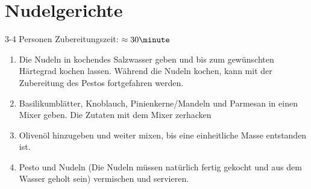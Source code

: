 \chapter{Nudelgerichte}
3-4 Personen \hfill Zubereitungszeit: $\approx30 \minute$
\hspace{0em}\\
\begin{enumerate}
\item   Die Nudeln in kochendes Salzwasser geben und bis zum gewünschten Härtegrad kochen lassen.
        Während die Nudeln kochen, kann mit der Zubereitung des Pestos fortgefahren werden.
\item   Basilikumblätter, Knoblauch, Pinienkerne/Mandeln und Parmesan in einen Mixer geben.
        Die Zutaten mit dem Mixer zerhacken
\item   Olivenöl hinzugeben und weiter mixen, bis eine einheitliche Masse entstanden ist.
\item   Pesto und Nudeln (Die Nudeln müssen natürlich fertig gekocht und aus dem Wasser geholt sein) vermischen und servieren.
\end{enumerate}
